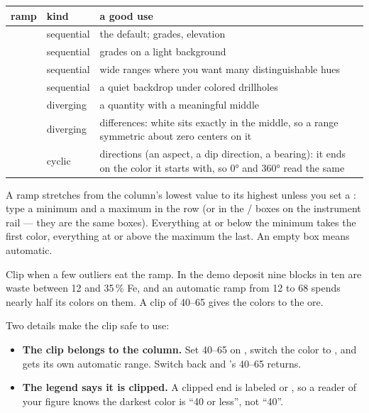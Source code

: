 \begin{center}
\begin{tabularx}{\linewidth}{@{}llL@{}}\toprule
ramp & kind & a good use \\ \midrule
{} & sequential & the default; grades, elevation \\
 & sequential & grades on a light background \\
 & sequential & wide ranges where you want many distinguishable hues \\
 & sequential & a quiet backdrop under colored drillholes \\
 & diverging & a quantity with a meaningful middle \\
 & diverging & differences: white sits exactly in the middle, so a range symmetric about zero centers on it \\
 & cyclic & directions (an aspect, a dip direction, a bearing): it ends on the color it starts with, so 0° and 360° read the same \\ \bottomrule
\end{tabularx}
\end{center}

A ramp stretches from the column's lowest value to its highest unless you set a : type a minimum and a maximum in the  row (or in the / boxes on the instrument rail — they are the same boxes). Everything at or below the minimum takes the first color, everything at or above the maximum the last. An empty box means automatic.

Clip when a few outliers eat the ramp. In the demo deposit nine blocks in ten are waste between 12 and 35\,\% Fe, and an automatic ramp from 12 to 68 spends nearly half its colors on them. A clip of 40–65 gives the colors to the ore.

Two details make the clip safe to use:

\begin{itemize}
\item \textbf{The clip belongs to the column.} Set 40–65 on , switch the color to , and  gets its own automatic range. Switch back and 's 40–65 returns.
\item \textbf{The legend says it is clipped.} A clipped end is labeled  or , so a reader of your figure knows the darkest color is “40 or less”, not “40”.
\end{itemize}

